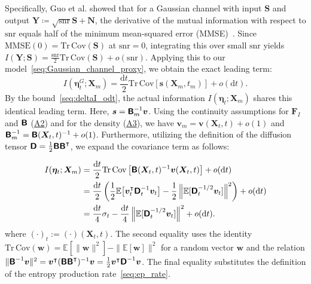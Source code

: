 Specifically, Guo et al. showed that for a Gaussian channel with input $\bm S$ and output $\bm Y \coloneq \sqrt{\mathrm{snr}}\bm S + \bm N$, the derivative of the mutual information with respect to $\mathrm{snr}$ equals half of the minimum mean-squared error (MMSE)~\cite{guo2005mutual}. Since $\mathrm{MMSE}(0) = \mathrm{Tr}\,\mathrm{Cov}(\bm S)$ at $\mathrm{snr}=0$, integrating this over small $\mathrm{snr}$ yields $I(\bm Y; \bm S) = \frac{\mathrm{snr}}{2}\mathrm{Tr}\,\mathrm{Cov}(\bm S) + o(\mathrm{snr})$. Applying this to our model~\eqref{seq:Gaussian_channel_proxy}, we obtain the exact leading term:
\begin{equation}
    I(\bm{\eta}_t^G;\bm{X}_m)
    =\frac{\mathrm{d}t}{2}\mathrm{Tr}\,\mathrm{Cov}\left[
    \bm{s}(\bm{X}_m,t_m)
    \right]+o(\mathrm{d}t).
    \label{seq:I_G_I_MMSE}
\end{equation}
By the bound~\eqref{seq:deltaI_odt}, the actual information $I(\bm\eta_t;\bm X_m)$ shares this identical leading term. Here, $\bm s = \boldsymbol{\mathsf{B}}_m^{-1}\bm v$. Using the continuity assumptions for $\bm F_I$ and $\boldsymbol{\mathsf{B}}$ (\hyperlink{assumption:A2}{A2}) and for the density (\hyperlink{assumption:A3}{A3}), we have $\bm v_m = \bm v(\bm X_t, t) + o(1)$ and $\boldsymbol{\mathsf{B}}_m^{-1} = \boldsymbol{\mathsf{B}}(\bm X_t, t)^{-1} + o(1)$. Furthermore, utilizing the definition of the diffusion tensor $\boldsymbol{\mathsf{D}} = \frac{1}{2}\boldsymbol{\mathsf{B}}\boldsymbol{\mathsf{B}}^\intercal$, we expand the covariance term as follows:

\begin{equation}
\begin{aligned}
    I(\bm\eta_t;\bm{X}_m)
    &=\frac{\mathrm dt}{2}\mathrm{Tr}\,\mathrm{Cov}\left[
    \boldsymbol{\mathsf{B}}(\bm X_t,t)^{-1}\bm v(\bm X_t,t)\right]
    +o(\mathrm dt)
    \\
    &=\frac{\mathrm dt}{2}\left(
    \frac{1}{2}\mathbb E\!\left[
    \bm v_t^\intercal\boldsymbol{\mathsf{D}}_t^{-1}\bm v_t
    \right]
    -\frac{1}{2}\left\|\mathbb E[\boldsymbol{\mathsf{D}}_t^{-1/2}\bm v_t]\right\|^2
    \right)+o(\mathrm dt)
    \\
    &=\frac{\mathrm dt}{4}\sigma_t
    -\frac{\mathrm dt}{4}\left\|\mathbb E[\boldsymbol{\mathsf{D}}_t^{-1/2}\bm v_t]\right\|^2
    +o(\mathrm dt).
\end{aligned}
    \label{seq:I_EP_relation}
\end{equation}
where $(\cdot)_t := (\cdot)(\bm X_t, t)$. The second equality uses the identity $\mathrm{Tr}\,\mathrm{Cov}(\bm w) = \mathbb E[\|\bm w\|^2] - \|\mathbb E[\bm w]\|^2$ for a random vector $\bm w$ and the relation $\|\boldsymbol{\mathsf{B}}^{-1}\bm v\|^2 = \bm v^\intercal (\boldsymbol{\mathsf{B}} \boldsymbol{\mathsf{B}}^\intercal)^{-1} \bm v = \frac{1}{2}\bm v^\intercal \boldsymbol{\mathsf{D}}^{-1} \bm v$. The final equality substitutes the definition of the entropy production rate~\eqref{seq:ep_rate}.

